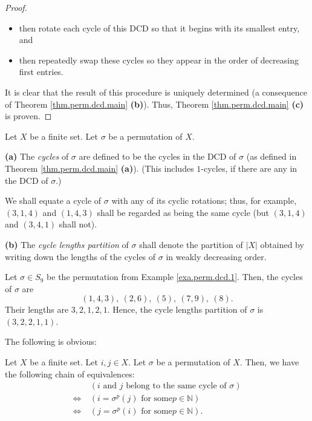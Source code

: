 \begin{proof}
\begin{itemize}
\item then rotate each cycle of this DCD so that it begins with its smallest
entry, and

\item then repeatedly swap these cycles so they appear in the order of
decreasing first entries.
\end{itemize}

It is clear that the result of this procedure is uniquely determined (a
consequence of Theorem \ref{thm.perm.dcd.main} \textbf{(b)}). Thus, Theorem
\ref{thm.perm.dcd.main} \textbf{(c)} is proven.
\end{proof}

\begin{definition}
\label{def.perm.cycs.cycs}Let $X$ be a finite set. Let $\sigma$ be a
permutation of $X$. \medskip

\textbf{(a)} The \emph{cycles} of $\sigma$ are defined to be the cycles in the
DCD of $\sigma$ (as defined in Theorem \ref{thm.perm.dcd.main} \textbf{(a)}).
(This includes $1$-cycles, if there are any in the DCD of $\sigma$.)

We shall equate a cycle of $\sigma$ with any of its cyclic rotations; thus,
for example, $\left(  3,1,4\right)  $ and $\left(  1,4,3\right)  $ shall be
regarded as being the same cycle (but $\left(  3,1,4\right)  $ and $\left(
3,4,1\right)  $ shall not). \medskip

\textbf{(b)} The \emph{cycle lengths partition} of $\sigma$ shall denote the
partition of $\left\vert X\right\vert $ obtained by writing down the lengths
of the cycles of $\sigma$ in weakly decreasing order.
\end{definition}

\begin{example}
Let $\sigma\in S_{9}$ be the permutation from Example \ref{exa.perm.dcd.1}.
Then, the cycles of $\sigma$ are%
\[
\left(  1,4,3\right)  ,\ \left(  2,6\right)  ,\ \left(  5\right)  ,\ \left(
7,9\right)  ,\ \left(  8\right)  .
\]
Their lengths are $3,2,1,2,1$. Hence, the cycle lengths partition of $\sigma$
is $\left(  3,2,2,1,1\right)  $.
\end{example}

The following is obvious:

\begin{proposition}
\label{prop.perm.cycs.same}Let $X$ be a finite set. Let $i,j\in X$. Let
$\sigma$ be a permutation of $X$. Then, we have the following chain of
equivalences:%
\begin{align*}
\  &  \left(  i\text{ and }j\text{ belong to the same cycle of }\sigma\right)
\\
\Longleftrightarrow\  &  \left(  i=\sigma^{p}\left(  j\right)  \text{ for some
}p\in\mathbb{N}\right) \\
\Longleftrightarrow\  &  \left(  j=\sigma^{p}\left(  i\right)  \text{ for some
}p\in\mathbb{N}\right)  .
\end{align*}

\end{proposition}

